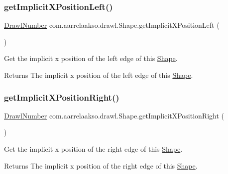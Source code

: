 \subsubsection{\texorpdfstring{get\+Implicit\+X\+Position\+Left()}{getImplicitXPositionLeft()}}
{\footnotesize\ttfamily \hyperlink{classcom_1_1aarrelaakso_1_1drawl_1_1_drawl_number}{Drawl\+Number} com.\+aarrelaakso.\+drawl.\+Shape.\+get\+Implicit\+X\+Position\+Left (\begin{DoxyParamCaption}{ }\end{DoxyParamCaption})\hspace{0.3cm}{\ttfamily [protected]}}



Get the implicit x position of the left edge of this \hyperlink{classcom_1_1aarrelaakso_1_1drawl_1_1_shape}{Shape}. 

\begin{DoxyReturn}{Returns}
The implicit x position of the left edge of this \hyperlink{classcom_1_1aarrelaakso_1_1drawl_1_1_shape}{Shape}. 
\end{DoxyReturn}
\mbox{\label{classcom_1_1aarrelaakso_1_1drawl_1_1_shape_aedcaf32e6be1114111e5ee2ddb1214a3}} 
\subsubsection{\texorpdfstring{get\+Implicit\+X\+Position\+Right()}{getImplicitXPositionRight()}}
{\footnotesize\ttfamily \hyperlink{classcom_1_1aarrelaakso_1_1drawl_1_1_drawl_number}{Drawl\+Number} com.\+aarrelaakso.\+drawl.\+Shape.\+get\+Implicit\+X\+Position\+Right (\begin{DoxyParamCaption}{ }\end{DoxyParamCaption})\hspace{0.3cm}{\ttfamily [protected]}}



Get the implicit x position of the right edge of this \hyperlink{classcom_1_1aarrelaakso_1_1drawl_1_1_shape}{Shape}. 

\begin{DoxyReturn}{Returns}
The implicit x position of the right edge of this \hyperlink{classcom_1_1aarrelaakso_1_1drawl_1_1_shape}{Shape}. 
\end{DoxyReturn}
\mbox{\label{classcom_1_1aarrelaakso_1_1drawl_1_1_shape_af04961079cb3993d8f73670e6695415b}} 

